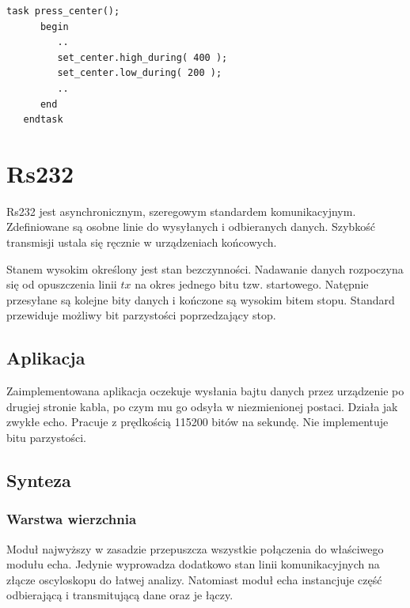 \documentclass[a4paper,12pt]{article}
\begin{document}
\begin{lstlisting}[label=Rotor_behav,caption=Rotor\_behav.v]
   task press_center();
      begin
         ..
         set_center.high_during( 400 );
         set_center.low_during( 200 );
         ..
      end
   endtask
\end{lstlisting}


\newpage
\section{Rs232}

Rs232 jest asynchronicznym, szeregowym standardem komunikacyjnym. Zdefiniowane są osobne linie do wysyłanych i odbieranych danych. Szybkość transmisji ustala się ręcznie w urządzeniach końcowych.

Stanem wysokim określony jest stan bezczynności. Nadawanie danych rozpoczyna się od opuszczenia linii $tx$ na okres jednego bitu tzw. startowego. Natępnie przesyłane są kolejne bity danych i kończone są wysokim bitem stopu. Standard przewiduje możliwy bit parzystości poprzedzający stop.

\subsection{Aplikacja}
Zaimplementowana aplikacja oczekuje wysłania bajtu danych przez urządzenie po drugiej stronie kabla, po czym mu go odsyła w niezmienionej postaci. Działa jak zwykłe echo. Pracuje z prędkością 115200 bitów na sekundę. Nie implementuje bitu parzystości.

\subsection{Synteza}

\subsubsection{Warstwa wierzchnia}

Moduł najwyższy w zasadzie przepuszcza wszystkie połączenia do właściwego modułu echa. Jedynie wyprowadza dodatkowo stan linii komunikacyjnych na złącze oscyloskopu do łatwej analizy. Natomiast moduł echa instancjuje część odbierającą i transmitującą dane oraz je łączy.

\end{document}
